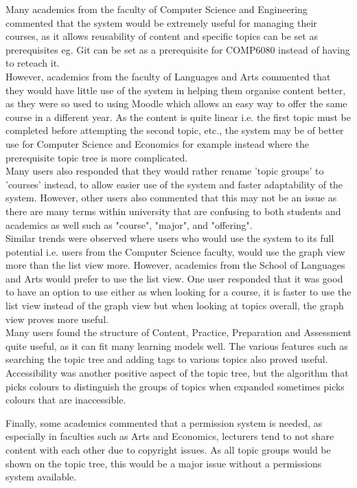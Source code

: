 Many academics from the faculty of Computer Science and Engineering commented that the system would be extremely useful for managing their courses, as it allows reusability of content and specific topics can be set as prerequisites eg. Git can be set as a prerequisite for COMP6080 instead of having to reteach it.\\

However, academics from the faculty of Languages and Arts commented that they would have little use of the system in helping them organise content better, as they were so used to using Moodle which allows an easy way to offer the same course in a different year. As the content is quite linear i.e. the first topic must be completed before attempting the second topic, etc., the system may be of better use for Computer Science and Economics for example instead where the prerequisite topic tree is more complicated.\\

Many users also responded that they would rather rename 'topic groups' to 'courses' instead, to allow easier use of the system and faster adaptability of the system. However, other users also commented that this may not be an issue as there are many terms within university that are confusing to both students and academics as well such as "course", "major", and "offering".\\

Similar trends were observed where users who would use the system to its full potential i.e. users from the Computer Science faculty, would use the graph view more than the list view more. However, academics from the School of Languages and Arts would prefer to use the list view. One user responded that it was good to have an option to use either as when looking for a course, it is faster to use the list view instead of the graph view but when looking at topics overall, the graph view proves more useful.\\

Many users found the structure of Content, Practice, Preparation and Assessment quite useful, as it can fit many learning models well. The various features such as searching the topic tree and adding tags to various topics also proved useful. Accessibility was another positive aspect of the topic tree, but the algorithm that picks colours to distinguish the groups of topics when expanded sometimes picks colours that are inaccessible. 

Finally, some academics commented that a permission system is needed, as especially in faculties such as Arts and Economics, lecturers tend to not share content with each other due to copyright issues. As all topic groups would be shown on the topic tree, this would be a major issue without a permissions system available.\\

